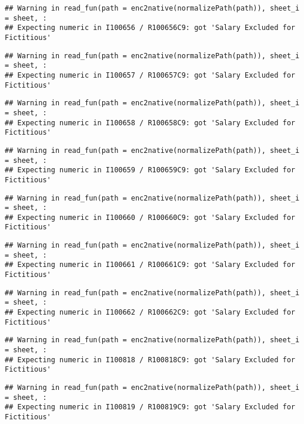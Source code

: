\documentclass[
]{article}
\begin{document}
\begin{verbatim}
## Warning in read_fun(path = enc2native(normalizePath(path)), sheet_i = sheet, :
## Expecting numeric in I100656 / R100656C9: got 'Salary Excluded for Fictitious'
\end{verbatim}

\begin{verbatim}
## Warning in read_fun(path = enc2native(normalizePath(path)), sheet_i = sheet, :
## Expecting numeric in I100657 / R100657C9: got 'Salary Excluded for Fictitious'
\end{verbatim}

\begin{verbatim}
## Warning in read_fun(path = enc2native(normalizePath(path)), sheet_i = sheet, :
## Expecting numeric in I100658 / R100658C9: got 'Salary Excluded for Fictitious'
\end{verbatim}

\begin{verbatim}
## Warning in read_fun(path = enc2native(normalizePath(path)), sheet_i = sheet, :
## Expecting numeric in I100659 / R100659C9: got 'Salary Excluded for Fictitious'
\end{verbatim}

\begin{verbatim}
## Warning in read_fun(path = enc2native(normalizePath(path)), sheet_i = sheet, :
## Expecting numeric in I100660 / R100660C9: got 'Salary Excluded for Fictitious'
\end{verbatim}

\begin{verbatim}
## Warning in read_fun(path = enc2native(normalizePath(path)), sheet_i = sheet, :
## Expecting numeric in I100661 / R100661C9: got 'Salary Excluded for Fictitious'
\end{verbatim}

\begin{verbatim}
## Warning in read_fun(path = enc2native(normalizePath(path)), sheet_i = sheet, :
## Expecting numeric in I100662 / R100662C9: got 'Salary Excluded for Fictitious'
\end{verbatim}

\begin{verbatim}
## Warning in read_fun(path = enc2native(normalizePath(path)), sheet_i = sheet, :
## Expecting numeric in I100818 / R100818C9: got 'Salary Excluded for Fictitious'
\end{verbatim}

\begin{verbatim}
## Warning in read_fun(path = enc2native(normalizePath(path)), sheet_i = sheet, :
## Expecting numeric in I100819 / R100819C9: got 'Salary Excluded for Fictitious'
\end{verbatim}
\end{document}
